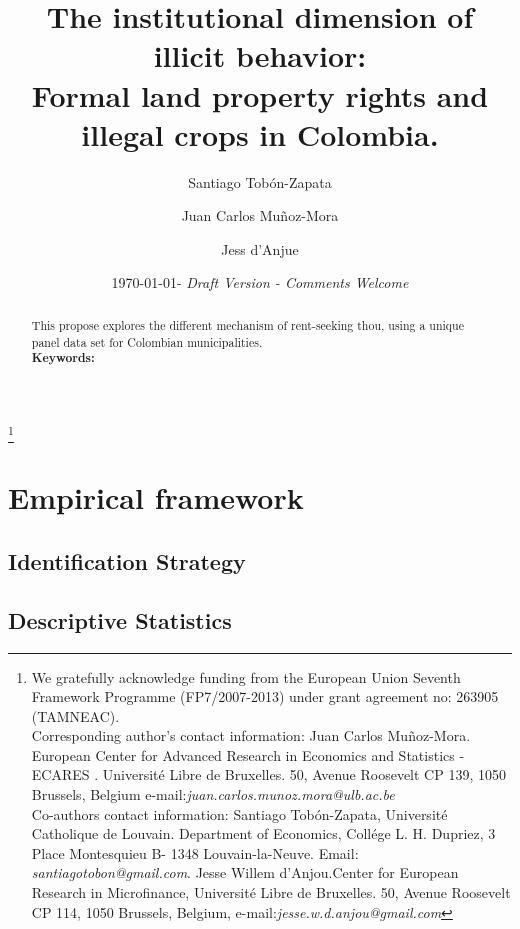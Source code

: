 \documentclass[11pt,a4paper,english]{amsart}
\begin{document}
\title[The institutional dimension of illicit behavior]{The institutional dimension of illicit behavior: \\Formal land property rights and illegal crops in Colombia.}\singlespacing    
\author[Tob\' on \& Mu\~noz-Mora \& d'Anjue (2013)]{Santiago Tob\'on-Zapata \and Juan Carlos Mu\~noz-Mora \and Jess d'Anjue} 
\thanks{We gratefully acknowledge funding from the European Union Seventh Framework Programme (FP7/2007-2013) under grant agreement no: 263905 (TAMNEAC). \\
Corresponding author’s contact information: Juan Carlos Mu\~noz-Mora. European Center for Advanced Research in Economics and Statistics -ECARES . Universit\'e Libre de Bruxelles. 50, Avenue Roosevelt CP 139, 1050 Brussels, Belgium  e-mail:\textit{juan.carlos.munoz.mora@ulb.ac.be} \\
Co-authors contact information: Santiago Tob\'on-Zapata, Universit\'e Catholique de Louvain. Department of Economics, Coll\'ege L. H. Dupriez, 3 Place Montesquieu B- 1348 Louvain-la-Neuve. Email: \textit{santiagotobon@gmail.com}.  Jesse Willem d'Anjou.Center for European Research in Microfinance, Universit\'e Libre de Bruxelles. 50, Avenue Roosevelt CP 114, 1050 Brussels, Belgium, e-mail:\textit{jesse.w.d.anjou@gmail.com} }

\date{\today - \emph{Draft Version - Comments Welcome}}
\maketitle
\begin{abstract} \singlespacing    
This propose explores the different mechanism of rent-seeking thou, using a unique panel data set for Colombian municipalities. \\ 
 \textbf{Keywords:} 
\end{abstract}

\section{Empirical framework}



\subsection{Identification Strategy}

\subsection{Descriptive Statistics}
\end{document}
